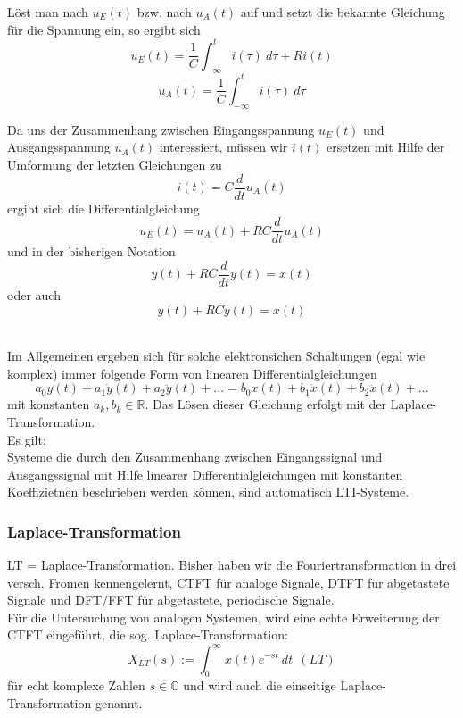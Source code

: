 \documentclass[12pt,a4paper]{scrartcl}
\begin{document}
  \noindent Löst man nach $u_E(t)$ bzw. nach $u_A(t)$ auf und setzt die bekannte Gleichung für die Spannung ein, so ergibt sich
  $$ u_E(t) = \frac{1}{C} \int_{-\infty}^{t} i(\tau)\ d\tau + Ri(t)$$
  $$ u_A(t) = \frac{1}{C} \int_{-\infty}^{t} i(\tau)\ d\tau$$

  \noindent Da uns der Zusammenhang zwischen Eingangsspannung $u_E(t)$  und Ausgangsspannung $u_A(t)$ interessiert, müssen wir $i(t)$ ersetzen mit Hilfe der Umformung der letzten Gleichungen zu 
  $$ i(t) = C\frac{d}{dt}u_A(t)$$
  ergibt sich die Differentialgleichung
  $$ u_E(t) = u_A(t) + RC\frac{d}{dt}u_A(t)$$
  und in der bisherigen Notation
  $$ y(t) + RC\frac{d}{dt}y(t) = x(t)$$
  oder auch
  $$ y(t) + RC\dot{y}(t) = x(t)$$ 

  \noindent \\ Im Allgemeinen ergeben sich für solche elektronsichen Schaltungen (egal wie komplex) immer folgende Form von linearen Differentialgleichungen
  \begin{equation}
    \label{eq:32}
     a_0y(t) + a_1\dot{y}(t) + a_2 \ddot{y}(t)+  ... =  b_0x(t) + b_1\dot{x}(t) + b_2 \ddot{x}(t)+...
  \end{equation}
  mit konstanten $a_k, b_k \in \mathbb{R}$. Das Lösen dieser Gleichung erfolgt mit der Laplace-Transformation. \\

  \noindent Es gilt:\\
  Systeme die durch den Zusammenhang zwischen Eingangssignal und Ausgangssignal mit Hilfe linearer Differentialgleichungen mit konstanten Koeffizietnen beschrieben werden können, sind automatisch LTI-Systeme.

  \subsubsection{Laplace-Transformation}
  \label{sec:sub:sub:laplace}

  LT = Laplace-Transformation. Bisher haben wir die Fouriertransformation in drei versch. 
  Fromen kennengelernt, CTFT für analoge Signale, DTFT für abgetastete Signale und DFT/FFT für abgetastete, periodische Signale. \\

  \noindent Für die Untersuchung von analogen Systemen, wird eine echte Erweiterung der CTFT eingeführt, die sog. Laplace-Transformation:
  \begin{equation}
    \label{eq:33}
    X_{LT}(s) := \int_{0^-}^{\infty} x(t) e^{-st}\ dt\ \ (LT)
  \end{equation}
  für echt komplexe Zahlen $s \in \mathbb{C}$ und wird auch die einseitige Laplace-Transformation genannt. \\
\end{document}
